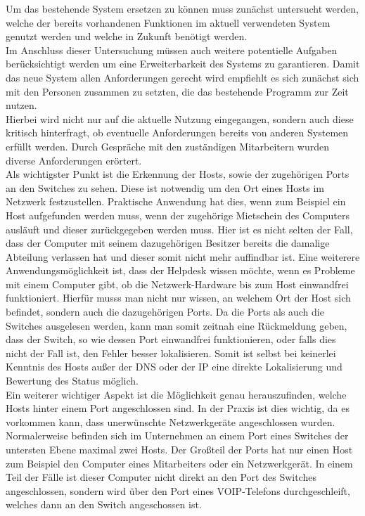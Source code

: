 Um das bestehende System ersetzen zu können muss zunächst untersucht werden, welche der bereits vorhandenen Funktionen im aktuell verwendeten System genutzt werden und welche in Zukunft benötigt werden.\\
Im Anschluss dieser Untersuchung müssen auch weitere potentielle Aufgaben berücksichtigt werden um eine Erweiterbarkeit des Systems zu garantieren.
Damit das neue System allen Anforderungen gerecht wird empfiehlt es sich zunächst sich mit den Personen zusammen zu setzten, die das bestehende Programm zur Zeit nutzen.\\
Hierbei wird nicht nur auf die aktuelle Nutzung eingegangen, sondern auch diese kritisch hinterfragt, ob eventuelle Anforderungen bereits von anderen Systemen erfüllt werden.
Durch Gespräche mit den zuständigen Mitarbeitern wurden diverse Anforderungen erörtert.\\
Als wichtigster Punkt ist die Erkennung der Hosts, sowie der zugehörigen Ports an den Switches zu sehen.
Diese ist notwendig um den Ort eines Hosts im Netzwerk festzustellen. Praktische Anwendung hat dies, wenn zum Beispiel ein Host aufgefunden werden muss, wenn der zugehörige Mietschein des Computers ausläuft und dieser zurückgegeben werden muss.
Hier ist es nicht selten der Fall, dass der Computer mit seinem dazugehörigen Besitzer bereits die damalige Abteilung verlassen hat und dieser somit nicht mehr auffindbar ist.
Eine weiterere Anwendungsmöglichkeit ist, dass der Helpdesk wissen möchte, wenn es Probleme mit einem Computer gibt, ob die Netzwerk-Hardware bis zum Host einwandfrei funktioniert. Hierfür musss man nicht nur wissen, an welchem Ort der Host sich befindet, sondern auch die dazugehörigen Ports.
Da die Ports als auch die Switches ausgelesen werden, kann man somit zeitnah eine Rückmeldung geben, dass der Switch, so wie dessen Port einwandfrei funktionieren, oder falls dies nicht der Fall ist, den Fehler besser lokalisieren. Somit ist selbst bei keinerlei Kenntnis des Hosts außer der DNS oder der IP eine direkte Lokalisierung und Bewertung des Status möglich.\\
Ein weiterer wichtiger Aspekt ist die Möglichkeit genau herauszufinden, welche Hosts hinter einem Port angeschlossen sind.
In der Praxis ist dies wichtig, da es vorkommen kann, dass unerwünschte Netzwerkgeräte angeschlossen wurden.
Normalerweise befinden sich im Unternehmen an einem Port eines Switches der untersten Ebene maximal zwei Hosts. Der Großteil der Ports hat nur einen Host zum Beispiel den Computer eines Mitarbeiters oder ein Netzwerkgerät. In einem Teil der Fälle ist dieser Computer nicht direkt an den Port des Switches angeschlossen, sondern wird über den Port eines VOIP-Telefons durchgeschleift, welches dann an den Switch angeschossen ist.
